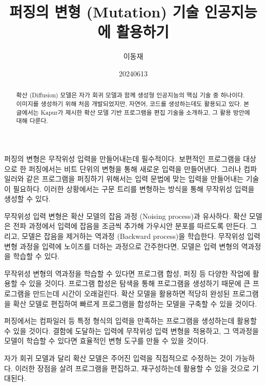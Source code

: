 \documentclass[11pt, oneside]{article}   	%
\title{퍼징의 변형 (Mutation) 기술 인공지능에 활용하기}
\author{이동재}
\date{20240613}
\begin{document}
\maketitle


\begin{abstract}
  확산 (Diffusion) 모델은 자가 회귀 모델과 함께 생성형 인공지능의 핵심 기술 중 하나이다. 이미지를 생성하기 위해 처음 개발되었지만, 자연어, 코드를 생성하는데도 활용되고 있다. 본 글에서는 Kapur가 제시한 확산 모델 기반 프로그램을 편집 기술을 소개하고, 그 활용 방안에 대해 다룬다.
\end{abstract}
퍼징의 변형은 무작위성 입력을 만들어내는데 필수적이다. 보편적인 프로그램을 대상으로 한 퍼징에서는 비트 단위의 변형을 통해 새로운 입력을 만들어낸다. 그러나 컴파일러와 같은 프로그램을 퍼징하기 위해서는 입력 문법에 맞는 입력을 만들어내는 기술이 필요하다. 이러한 상황에서는 구문 트리를 변형하는 방식을 통해 무작위성 입력을 생성할 수 있다.

무작위성 입력 변형은 확산 모델의 잡음 과정 (Noising process)과 유사하다. 확산 모델은 전파 과정에서 입력에 잡음을 조금씩 추가해 가우시안 분포를 따르도록 만든다. 그리고, 모델은 잡음을 제거하는 역과정 (Backward process)을 학습한다. 무작위성 입력 변형 과정을 입력에 노이즈를 더하는 과정으로 간주한다면, 모델은 입력 변형의 역과정을 학습할 수 있다.

무작위성 변형의 역과정을 학습할 수 있다면 프로그램 합성, 퍼징 등 다양한 작업에 활용할 수 있을 것이다. 프로그램 합성은 탐색을 통해 프로그램을 생성하기 때문에 큰 프로그램을 만드는데 시간이 오래걸린다. 확산 모델을 활용하면 적당히 완성된 프로그램을 확산 모델로 편집하여 빠르게 프로그램을 합성하는 모델을 구축할 수 있을 것이다.

퍼징에서는 컴파일러 등 특정 형식의 입력을 만족하는 프로그램을 생성하는데 활용할 수 있을 것이다. 결함에 도달하는 입력에 무작위성 입력 변형을 적용하고, 그 역과정을 모델이 학습할 수 있다면 효율적인 변형 도구를 만들 수 있을 것이다.

자가 회귀 모델과 달리 확산 모델은 주어진 입력을 직접적으로 수정하는 것이 가능하다. 이러한 장점을 살려 프로그램을 편집하고, 재구성하는데 활용할 수 있을 것으로 기대된다.
\end{document}
